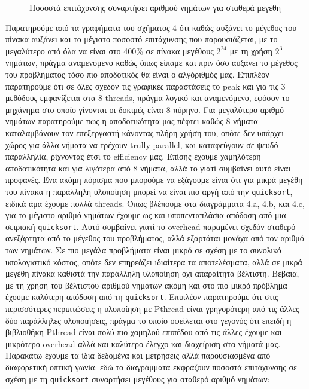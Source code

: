 \documentclass[11pt,a4paper,titlepage]{article}
\begin{document}
\begin{figure}[h!]
\begin{subfigure}[b]{0.45\textwidth}
				\caption{}
			\end{subfigure}
			\caption{Ποσοστά επιτάχυνσης συναρτήσει αριθμού νημάτων για σταθερά μεγέθη}	  
		\end{figure}
		Παρατηρούμε από τα γραφήματα του σχήματος 4 ότι καθώς αυξάνει το μέγεθος του πίνακα αυξάνει και το μέγιστο ποσοστό επιτάχυνσης που παρουσιάζεται, με το μεγαλύτερο από όλα να είναι στο 400\% σε πίνακα μεγέθους $2^{24}$ με τη χρήση $2^3$ νημάτων, πράγμα αναμενόμενο καθώς όπως είπαμε και πριν όσο αυξάνει το μέγεθος του προβλήματος τόσο πιο αποδοτικός θα είναι ο αλγόριθμός μας. Επιπλέον παρατηρούμε ότι σε όλες σχεδόν τις γραφικές παραστάσεις το peak και για τις 3 μεθόδους εμφανίζεται στα 8 threads, πράγμα λογικό και αναμενόμενο, εφόσον το μηχάνημα στο οποίο γίνονται οι δοκιμές είναι 8-πύρηνο. Για μεγαλύτερο αριθμό νημάτων παρατηρούμε πως η αποδοτικότητα μας πέφτει καθώς 8 νήματα καταλαμβάνουν τον επεξεργαστή κάνοντας πλήρη χρήση του, οπότε δεν υπάρχει χώρος για άλλα νήματα να τρέχουν trully parallel, και καταφεύγουν σε ψευδό-παραλληλία, ρίχνοντας έτσι το efficiency μας. Επίσης έχουμε χαμηλότερη αποδοτικότητα και για λιγότερα από 8 νήματα, αλλά το γιατί συμβαίνει αυτό είναι προφανές. Ένα ακόμη πόρισμα που μπορούμε να εξάγουμε είναι ότι για μικρά μεγέθη του πίνακα η παράλληλη υλοποίηση μπορεί να είναι πιο αργή από την \verb|quicksort|, ειδικά άμα έχουμε πολλά threads. Όπως βλέπουμε στα διαγράμματα 4.a, 4.b, και 4.c, για το μέγιστο αριθμό νημάτων έχουμε ως και υποπενταπλάσια απόδοση από μια σειριακή \verb|quicksort|. Αυτό συμβαίνει γιατί το overhead παραμένει σχεδόν σταθερό ανεξάρτητα από το μέγεθος του προβλήματος, αλλά εξαρτάται μονάχα από τον αριθμό των νημάτων. Σε πιο μεγάλα προβλήματα είναι μικρό σε σχέση με το συνολικό υπολογιστικό κόστος, οπότε δεν επηρεάζει ιδιαίτερα τα αποτελέσματα, αλλά σε μικρά μεγέθη πίνακα καθιστά την παράλληλη υλοποίηση όχι απαραίτητα βέλτιστη. Βέβαια, με τη χρήση του βέλτιστου αριθμού νημάτων ακόμη και στο πιο μικρό πρόβλημα έχουμε καλύτερη απόδοση από τη \verb|quicksort|. Επιπλέον παρατηρούμε ότι στις περισσότερες περιπτώσεις η υλοποίηση με Pthread είναι γρηγορότερη από τις άλλες δύο παράλληλες υλοποιήσεις, πράγμα το οποίο οφείλεται στο γεγονός ότι επειδή η βιβλιοθήκη Pthread είναι πολύ πιο χαμηλού επιπέδου από τις άλλες έχουμε και μικρότερο overhead αλλά και καλύτερο έλεγχο και διαχείριση στα νήματά μας.\\ 
		
		Παρακάτω έχουμε τα ίδια δεδομένα και μετρήσεις αλλά παρουσιασμένα από διαφορετική οπτική γωνία: εδώ τα διαγράμματα εκφράζουν ποσοστά επιτάχυνσης σε σχέση με τη \verb|quicksort| συναρτήσει μεγέθους για σταθερό αριθμό νημάτων:\\
				
\end{document}
